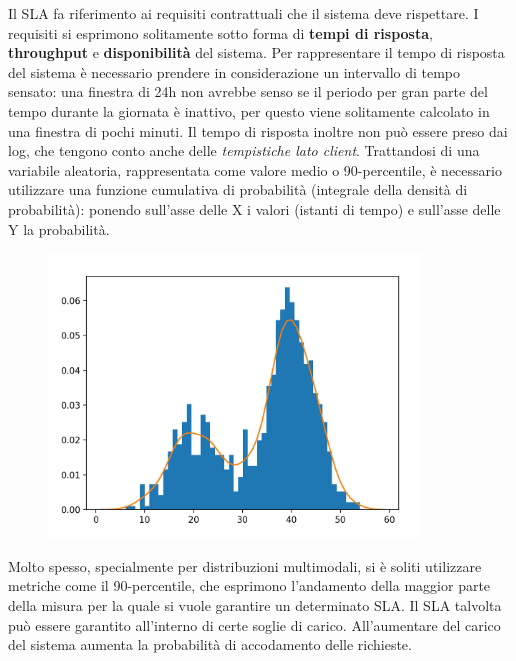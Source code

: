 \documentclass{article}
\begin{document}
		Il SLA fa riferimento ai requisiti contrattuali che il sistema deve
		rispettare. I requisiti si esprimono solitamente sotto forma di
		\textbf{tempi di risposta}, \textbf{throughput} e
		\textbf{disponibilità} del sistema. Per rappresentare il
		tempo di risposta del sistema è necessario prendere in
		considerazione un intervallo di tempo sensato: una finestra di
		24h non avrebbe senso se il periodo per gran parte del tempo
		durante la giornata è inattivo, per questo viene solitamente calcolato
		in una finestra di pochi minuti. Il tempo di risposta inoltre non può
		essere preso dai log, che tengono conto anche delle \emph{tempistiche
		lato client}. Trattandosi di una variabile aleatoria,
		rappresentata come valore medio o 90-percentile, è
		necessario utilizzare una funzione cumulativa di probabilità
		(integrale della densità di probabilità): ponendo
		sull'asse delle X i valori (istanti di tempo) e
		sull'asse delle Y la probabilità.\\
		\begin{figure}[ht]
			\centering
			\includegraphics[width=0.7\linewidth]{SAC_B8_sla}
			\label{fig:sacb8sla}
		\end{figure}
		Molto spesso, specialmente per distribuzioni multimodali, si è soliti utilizzare metriche
		come il 90-percentile, che esprimono l’andamento della maggior parte della misura
		per la quale si vuole garantire un determinato SLA.
		Il SLA talvolta può essere garantito all'interno di certe
		soglie di carico. All'aumentare del carico del sistema
		aumenta la probabilità di accodamento delle richieste.
		
\end{document}
